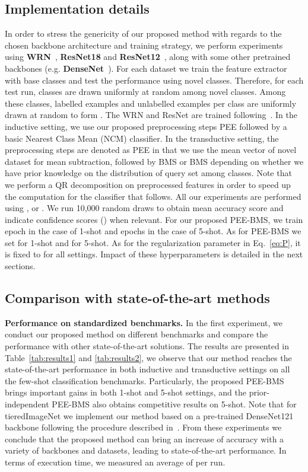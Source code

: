 \documentclass[review]{elsarticle}
\begin{document}
\subsection{Implementation details}

In order to stress the genericity of our proposed method with regards to the chosen backbone architecture and training strategy, we perform experiments using \textbf{WRN}~\cite{DBLP:conf/bmvc/ZagoruykoK16}, \textbf{ResNet18} and \textbf{ResNet12}~\cite{he2016deep}, along with some other pretrained backbones (e.g. \textbf{DenseNet}~\cite{huang2017densely, DBLP:journals/corr/abs-1911-04623}). For each dataset we train the feature extractor with base classes and test the performance using novel classes. Therefore, for each test run,  classes are drawn uniformly at random among novel classes. Among these  classes,  labelled examples and  unlabelled examples per class are uniformly drawn at random to form . The WRN and ResNet are trained following~\cite{mangla2020charting}. In the inductive setting, we use our proposed preprocessing steps PEE followed by a basic Nearest Class Mean (NCM) classifier. In the transductive setting, the preprocessing steps are denoted as PEE in that we use the mean vector of novel dataset for mean subtraction, followed by BMS or BMS depending on whether we have prior knowledge on the distribution of query set  among classes. Note that we perform a QR decomposition on preprocessed features in order to speed up the computation for the classifier that follows. All our experiments are performed using ,  or . We run 10,000 random draws to obtain mean accuracy score and indicate confidence scores () when relevant. For our proposed PEE-BMS, we train  epoch in the case of 1-shot and  epochs in the case of 5-shot. As for PEE-BMS we set  for 1-shot and  for 5-shot. As for the regularization parameter  in Eq.~\ref{eq:P}, it is fixed to  for all settings. Impact of these hyperparameters is detailed in the next sections.

\subsection{Comparison with state-of-the-art methods}
\textbf{Performance on standardized benchmarks.} In the first experiment, we conduct our proposed method on different benchmarks and compare the performance with other state-of-the-art solutions. The results are presented in Table~\ref{tab:results1} and \ref{tab:results2}, we observe that our method reaches the state-of-the-art performance in both inductive and transductive settings on all the few-shot classification benchmarks. Particularly, the proposed PEE-BMS brings important gains in both 1-shot and 5-shot settings, and the prior-independent PEE-BMS also obtains competitive results on 5-shot. Note that for tieredImageNet we implement our method based on a pre-trained DenseNet121 backbone following the procedure described in~\cite{DBLP:journals/corr/abs-1911-04623}. From these experiments we conclude that the proposed method can bring an increase of accuracy with a variety of backbones and datasets, leading to state-of-the-art performance. In terms of execution time, we measured an average of  per run.
\end{document}
